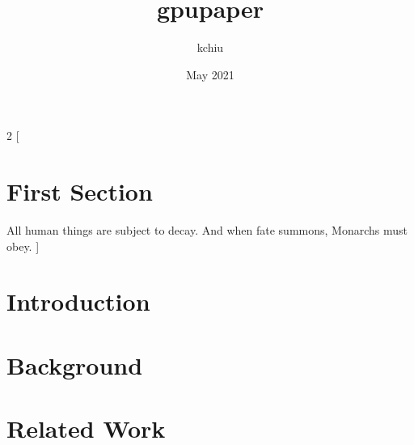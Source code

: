 \documentclass{article}
\title{gpupaper}
\author{kchiu }
\date{May 2021}
\begin{document}
\maketitle
\begin{multicols}{2}
[
\section{First Section}
All human things are subject to decay. And when fate summons, Monarchs must obey.
]





\end{multicols}
\section{Introduction}
\section{Background}
\section{Related Work}

\end{document}
